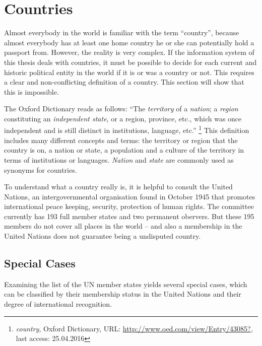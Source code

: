 \section{Countries} %
\label{sec:countries}

Almost everybody in the world is familiar with the term ``country'', because almost everybody has at least one home country he or she can potentially hold a passport from. However, the reality is very complex. If the information system of this thesis deals with countries, it must be possible to decide for each current and historic political entity in the world if it is or was a country or not. This requires a clear and non-conflicting definition of a country. This section will show that this is impossible.

The Oxford Dictionary reads as follows: ``The \emph{territory} of a \emph{nation}; a \emph{region} constituting an \emph{independent state}, or a region, province, etc., which was once independent and is still distinct in institutions, language, etc.''
\footnote{
  \emph{country},
  Oxford Dictionary,
  URL: \url{http://www.oed.com/view/Entry/43085?},
  last access: 25.04.2016
}
This definition includes many different concepts and terms: the territory or region that the country is on, a nation or state, a population and a culture of the territory in terms of institutions or languages. \emph{Nation} and \emph{state} are commonly used as synonyms for countries.

To understand what a country really is, it is helpful to consult the United Nations, an intergovernmental organisation found in October 1945 that promotes international peace keeping, security, protection of human rights. The committee currently has 193 full member states and two permanent obervers\cite{UNmembers}. But these 195 members do not cover all places in the world -- and also a membership in the United Nations does not guarantee being a undisputed country.

\subsection{Special Cases} %
\label{sub:special_cases}

Examining the list of the UN member states yields several special cases, which can be classified by their membership status in the United Nations and their degree of international recognition.



